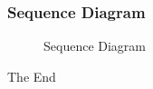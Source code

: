 \documentclass{beamer}
\begin{document}
\begin{frame}
	\frametitle{Sequence Diagram}
	\begin{figure}[!ht]
		\begin{center}
		\end{center}
		\caption{Sequence Diagram}
	\end{figure}
\end{frame}



\begin{frame}
\Huge{The End}
\end{frame}

\end{document}
